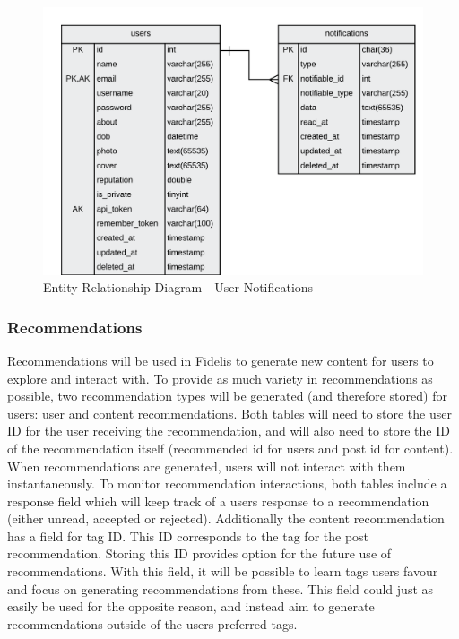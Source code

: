 \begin{figure}[H]
  \centering
  \includegraphics[width=1.0\textwidth]{Images/Design/Database/Notifications}
  \caption{Entity Relationship Diagram - User Notifications} \label{fig:ERD_Notifications}
\end{figure}

\subsubsection{Recommendations}
Recommendations will be used in Fidelis to generate new content for users to explore and interact with. To provide as much variety in recommendations as possible, two recommendation types will be generated (and therefore stored) for users: user and content recommendations. Both tables will need to store the user ID for the user receiving the recommendation, and will also need to store the ID of the recommendation itself (recommended id for users and post id for content). When recommendations are generated, users will not interact with them instantaneously. To monitor recommendation interactions, both tables include a response field which will keep track of a users response to a recommendation (either unread, accepted or rejected). Additionally the content recommendation has a field for tag ID. This ID corresponds to the tag for the post recommendation. Storing this ID provides option for the future use of recommendations. With this field, it will be possible to learn tags users favour and focus on generating recommendations from these. This field could just as easily be used for the opposite reason, and instead aim to generate recommendations outside of the users preferred tags.

